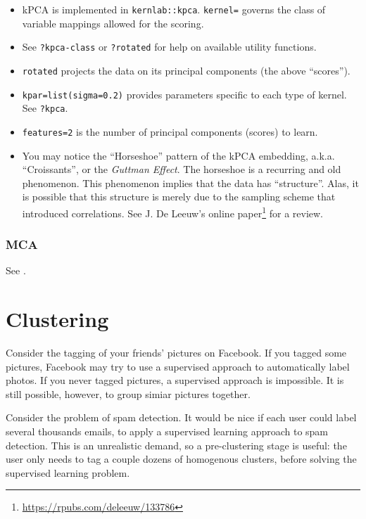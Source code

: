 \documentclass[]{book}
\providecommand{\tightlist}{%
  \setlength{\itemsep}{0pt}\setlength{\parskip}{0pt}}
\renewcommand{\href}[2]{#2\footnote{\url{#1}}}
\theoremstyle{definition}
\theoremstyle{definition}
\theoremstyle{definition}
\theoremstyle{remark}
\let\BeginKnitrBlock\begin \let\EndKnitrBlock\end
\begin{document}
\begin{itemize}
\tightlist
\item
  kPCA is implemented in \texttt{kernlab::kpca}. \texttt{kernel=} governs the class of variable mappings allowed for the scoring.
\item
  See \texttt{?\textquotesingle{}kpca-class\textquotesingle{}} or \texttt{?rotated} for help on available utility functions.
\item
  \texttt{rotated} projects the data on its principal components (the above ``scores'').
\item
  \texttt{kpar=list(sigma=0.2)} provides parameters specific to each type of kernel. See \texttt{?kpca}.
\item
  \texttt{features=2} is the number of principal components (scores) to learn.
\item
  You may notice the ``Horseshoe'' pattern of the kPCA embedding, a.k.a. ``Croissants'', or the \emph{Guttman Effect}. The horseshoe is a recurring and old phenomenon. This phenomenon implies that the data has ``structure''. Alas, it is possible that this structure is merely due to the sampling scheme that introduced correlations. See \href{https://rpubs.com/deleeuw/133786}{J. De Leeuw's online paper} for a review.
\end{itemize}

\hypertarget{mca}{%
\subsubsection{MCA}\label{mca}}

See \citet{izenman2008modern}.

\hypertarget{cluster}{%
\section{Clustering}\label{cluster}}

\BeginKnitrBlock{example}
\protect\hypertarget{exm:photos}{}{\label{exm:photos} }Consider the tagging of your friends' pictures on Facebook.
If you tagged some pictures, Facebook may try to use a supervised approach to automatically label photos.
If you never tagged pictures, a supervised approach is impossible.
It is still possible, however, to group simiar pictures together.
\EndKnitrBlock{example}

\BeginKnitrBlock{example}
\protect\hypertarget{exm:spam}{}{\label{exm:spam} }Consider the problem of spam detection.
It would be nice if each user could label several thousands emails, to apply a supervised learning approach to spam detection.
This is an unrealistic demand, so a pre-clustering stage is useful: the user only needs to tag a couple dozens of homogenous clusters, before solving the supervised learning problem.
\EndKnitrBlock{example}
\end{document}
